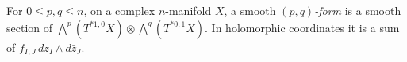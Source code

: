 
For $0\le p,q\le n$, on a complex $n$-manifold $X$, a smooth \emph{$(p,q)$-form} is a smooth section of $\bigwedge^p(T^{*1,0}X)\otimes\bigwedge^q(T^{*0,1}X)$. In holomorphic coordinates it is a sum of $f_{I,J}\,dz_I\wedge d\bar z_J$.
